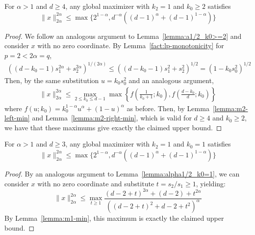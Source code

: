 \documentclass[11pt]{article}
\begin{document}
\begin{lemma}\label{lemma:alpha>1_k2=1_k0>=2}
For $\alpha>1$ and $d\geq 4$, any global maximizer with $k_2=1$ and $k_0\geq 2$ satisfies 
$$\|x\|_{2\alpha}^{2\alpha}\leq \max\{2^{1-\alpha},d^{-\alpha}((d-1)^{\alpha}+(d-1)^{1-\alpha})\}$$
\end{lemma}
\begin{proof}
We follow an analogous argument to Lemma~\ref{lemma:a1/2_k0>=2} and consider $x$ with no zero coordinate. By Lemma~\ref{fact:lp-monotonicity} for $p=2<2\alpha=q$, 
\begin{align*}
    ((d-k_0-1)s_1^{2\alpha}+s_2^{2\alpha})^{1/(2\alpha)}\leq ((d-k_0-1)s_1^2+s_2^2)^{1/2}=(1-k_0s_0^2)^{1/2}
\end{align*}
Then, by the same substitution $u=k_0s_0^2$ and an analogous argument, 
\begin{align*}
    \|x\|_{2\alpha}^{2\alpha}\leq \max_{2\leq k_0\leq d-1}\max \left\{f\left(\frac{1}{k_0+1};k_0\right),f\left(\frac{d-k_0}{d};k_0\right)\right\}
\end{align*}
where $f(u;k_0)=k_0^{1-\alpha}u^\alpha+(1-u)^\alpha$ as before. Then, by Lemma~\ref{lemma:m2-left-min} and Lemma~\ref{lemma:m2-right-min}, which is valid for $d\geq 4$ and $k_0\geq 2$, we have that these maximums give exactly the claimed upper bound. 
\end{proof}
\begin{lemma}\label{lemma:alpha>1_k2=1_k0=1}
   For $\alpha > 1$ and $d\geq 3$, any global maximizer with $k_2=1$ and $k_0=1$ satisfies 
$$\|x\|_{2\alpha}^{2\alpha}\leq \max\{2^{1-\alpha},d^{-\alpha}((d-1)^{\alpha}+(d-1)^{1-\alpha})\}$$
\end{lemma}
\begin{proof}
By an analogous argument to Lemma~\ref{lemma:alpha1/2_k0=1}, we can consider $x$ with no zero coordinate and substitute $t=s_2/s_1\geq 1$, yielding:
$$\|x\|_{2\alpha}^{2\alpha}\leq \max_{t\geq 1}\frac{(d-2+t)^{2\alpha}+(d-2)+t^{2\alpha}}{((d-2+t)^2+d-2+t^2)^\alpha}$$
By Lemma~\ref{lemma:m1-min}, this maximum is exactly the claimed upper bound. 
\end{proof}
\end{document}
